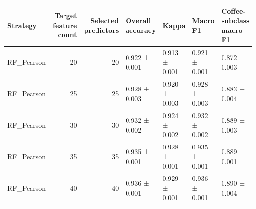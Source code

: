 \begin{tabular}{lrrllll}
\toprule
Strategy & Target feature count & Selected predictors & Overall accuracy & Kappa & Macro F1 & Coffee-subclass macro F1 \\
\midrule
RF_Pearson & 20 & 20 & 0.922 ± 0.001 & 0.913 ± 0.001 & 0.921 ± 0.001 & 0.872 ± 0.003 \\
RF_Pearson & 25 & 25 & 0.928 ± 0.003 & 0.920 ± 0.003 & 0.928 ± 0.003 & 0.883 ± 0.004 \\
RF_Pearson & 30 & 30 & 0.932 ± 0.002 & 0.924 ± 0.002 & 0.932 ± 0.002 & 0.889 ± 0.003 \\
RF_Pearson & 35 & 35 & 0.935 ± 0.001 & 0.928 ± 0.001 & 0.935 ± 0.001 & 0.889 ± 0.001 \\
RF_Pearson & 40 & 40 & 0.936 ± 0.001 & 0.929 ± 0.001 & 0.936 ± 0.001 & 0.890 ± 0.004 \\
\bottomrule
\end{tabular}
